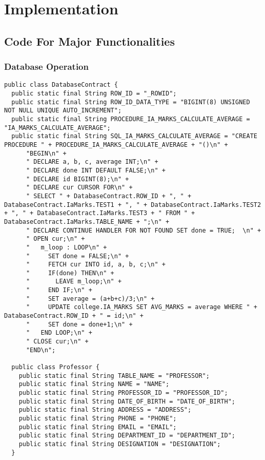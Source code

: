 \chapter{Implementation}
\section{Code For Major Functionalities}
\subsection{Database Operation}
\thispagestyle{fancy}

\begin{lstlisting}[caption=DatabaseContract.java]
public class DatabaseContract {
  public static final String ROW_ID = "_ROWID";
  public static final String ROW_ID_DATA_TYPE = "BIGINT(8) UNSIGNED NOT NULL UNIQUE AUTO_INCREMENT";
  public static final String PROCEDURE_IA_MARKS_CALCULATE_AVERAGE = "IA_MARKS_CALCULATE_AVERAGE";
  public static final String SQL_IA_MARKS_CALCULATE_AVERAGE = "CREATE PROCEDURE " + PROCEDURE_IA_MARKS_CALCULATE_AVERAGE + "()\n" +
      "BEGIN\n" +
      " DECLARE a, b, c, average INT;\n" +
      " DECLARE done INT DEFAULT FALSE;\n" +
      " DECLARE id BIGINT(8);\n" +
      " DECLARE cur CURSOR FOR\n" +
      " SELECT " + DatabaseContract.ROW_ID + ", " + DatabaseContract.IaMarks.TEST1 + ", " + DatabaseContract.IaMarks.TEST2 + ", " + DatabaseContract.IaMarks.TEST3 + " FROM " + DatabaseContract.IaMarks.TABLE_NAME + ";\n" +
      " DECLARE CONTINUE HANDLER FOR NOT FOUND SET done = TRUE;  \n" +
      " OPEN cur;\n" +
      "   m_loop : LOOP\n" +
      "     SET done = FALSE;\n" +
      "     FETCH cur INTO id, a, b, c;\n" +
      "     IF(done) THEN\n" +
      "       LEAVE m_loop;\n" +
      "     END IF;\n" +
      "     SET average = (a+b+c)/3;\n" +
      "     UPDATE college.IA_MARKS SET AVG_MARKS = average WHERE " + DatabaseContract.ROW_ID + " = id;\n" +
      "     SET done = done+1;\n" +
      "   END LOOP;\n" +
      " CLOSE cur;\n" +
      "END\n";

  public class Professor {
    public static final String TABLE_NAME = "PROFESSOR";
    public static final String NAME = "NAME";
    public static final String PROFESSOR_ID = "PROFESSOR_ID";
    public static final String DATE_OF_BIRTH = "DATE_OF_BIRTH";
    public static final String ADDRESS = "ADDRESS";
    public static final String PHONE = "PHONE";
    public static final String EMAIL = "EMAIL";
    public static final String DEPARTMENT_ID = "DEPARTMENT_ID";
    public static final String DESIGNATION = "DESIGNATION";
  }


\end{lstlisting}

